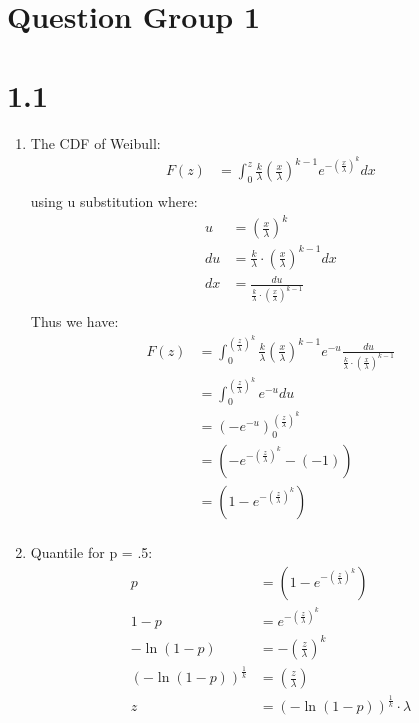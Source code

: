 \documentclass{article}
\title{\thetitle}
\author{\theauthor}
\begin{document}
\maketitle

\section*{Question Group 1}
\section*{1.1}
\begin{enumerate}
\item The CDF of Weibull: \\
\begin{align*}
F(z) &= \int_0^{z}\frac{k}{\lambda} (\frac{x}{\lambda})^{k-1}e^{-(\frac{x}{\lambda})^k} dx\\
\end{align*}
using u substitution where: 
\begin{align*}
u &= (\frac{x}{\lambda})^k \\
du &= \frac{k}{\lambda} \cdot (\frac{x}{\lambda})^{k-1}dx \\
dx &= \frac{du}{\frac{k}{\lambda} \cdot (\frac{x}{\lambda})^{k-1}} \\
\end{align*}
Thus we have: \\
\begin{align*}
F(z) &= \int_0^{(\frac{z}{\lambda})^k}\frac{k}{\lambda} (\frac{x}{\lambda})^{k-1}e^{-u}  \frac{du}{\frac{k}{\lambda} \cdot (\frac{x}{\lambda})^{k-1}}\\
&= \int_0^{ (\frac{z}{\lambda})^k} e^{-u} du \\
&= (-e^{-u})_0^{ (\frac{z}{\lambda})^k} \\
&= (-e^{-(\frac{z}{\lambda})^k} - (-1)) \\
&= (1 - e^{-(\frac{z}{\lambda})^k}) \\
\end{align*}
\item Quantile for p = .5: \\
\begin{align*}
p &= (1 - e^{-(\frac{z}{\lambda})^k}) \\
1 - p &= e^{-(\frac{z}{\lambda})^k} \\
-\ln(1 - p) &= -(\frac{z}{\lambda})^k \\
(-\ln(1 - p))^{\frac{1}{k}} &= (\frac{z}{\lambda}) \\
z &= (-\ln(1 - p))^{\frac{1}{k}} \cdot \lambda \\

\end{align*}
\end{enumerate}
\end{document}
